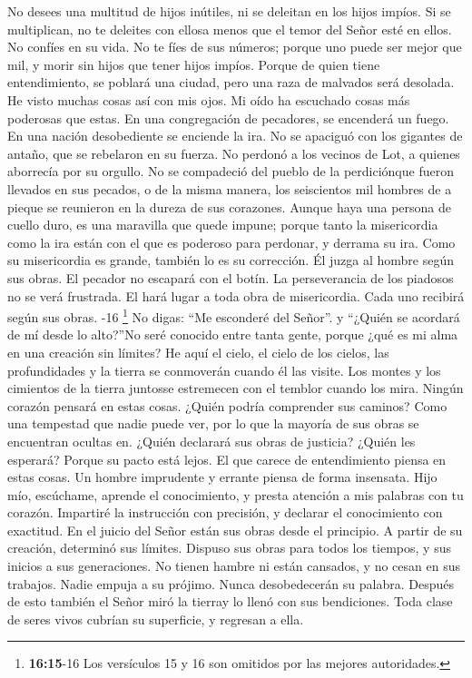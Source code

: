  No desees una multitud de hijos inútiles, ni se deleitan
en los hijos impíos.  Si se multiplican, no te deleites
con ellosa menos que el temor del Señor esté en ellos.  No
confíes en su vida. No te fíes de sus números; porque uno puede ser
mejor que mil, y morir sin hijos que tener hijos impíos. 
Porque de quien tiene entendimiento, se poblará una ciudad, pero una
raza de malvados será desolada.  He visto muchas cosas así
con mis ojos. Mi oído ha escuchado cosas más poderosas que estas.
 En una congregación de pecadores, se encenderá un fuego.
En una nación desobediente se enciende la ira.  No se
apaciguó con los gigantes de antaño, que se rebelaron en su fuerza.
 No perdonó a los vecinos de Lot, a quienes aborrecía por
su orgullo.  No se compadeció del pueblo de la
perdiciónque fueron llevados en sus pecados,  o de la
misma manera, los seiscientos mil hombres de a pieque se reunieron en la
dureza de sus corazones.  Aunque haya una persona de
cuello duro, es una maravilla que quede impune; porque tanto la
misericordia como la ira están con el que es poderoso para perdonar, y
derrama su ira.  Como su misericordia es grande, también
lo es su corrección. Él juzga al hombre según sus obras. 
El pecador no escapará con el botín. La perseverancia de los piadosos no
se verá frustrada.  El hará lugar a toda obra de
misericordia. Cada uno recibirá según sus obras. -16
\footnote{\textbf{16:15}-16 Los versículos 15 y 16 son omitidos por las
  mejores autoridades.}  No digas: ``Me esconderé del
Señor''. y ``¿Quién se acordará de mí desde lo alto?''No seré conocido
entre tanta gente, porque ¿qué es mi alma en una creación sin límites?
 He aquí el cielo, el cielo de los cielos, las
profundidades y la tierra se conmoverán cuando él las visite.
 Los montes y los cimientos de la tierra juntosse
estremecen con el temblor cuando los mira.  Ningún
corazón pensará en estas cosas. ¿Quién podría comprender sus caminos?
 Como una tempestad que nadie puede ver, por lo que la
mayoría de sus obras se encuentran ocultas en.  ¿Quién
declarará sus obras de justicia? ¿Quién les esperará? Porque su pacto
está lejos.  El que carece de entendimiento piensa en
estas cosas. Un hombre imprudente y errante piensa de forma insensata.
 Hijo mío, escúchame, aprende el conocimiento, y presta
atención a mis palabras con tu corazón.  Impartiré la
instrucción con precisión, y declarar el conocimiento con exactitud.
 En el juicio del Señor están sus obras desde el
principio. A partir de su creación, determinó sus límites.
 Dispuso sus obras para todos los tiempos, y sus inicios
a sus generaciones. No tienen hambre ni están cansados, y no cesan en
sus trabajos.  Nadie empuja a su prójimo. Nunca
desobedecerán su palabra.  Después de esto también el
Señor miró la tierray lo llenó con sus bendiciones.  Toda
clase de seres vivos cubrían su superficie, y regresan a ella.

